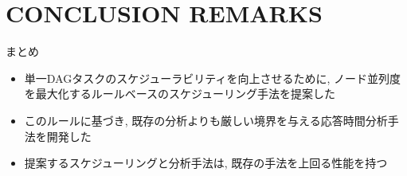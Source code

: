
\section{CONCLUSION REMARKS}
\label{sec: conclusion}

\begin{frame}{まとめ}
    \begin{itemize}
        \item 単一DAGタスクのスケジューラビリティを向上させるために, ノード並列度を最大化するルールベースのスケジューリング手法を提案した
        \item このルールに基づき, 既存の分析よりも厳しい境界を与える応答時間分析手法を開発した
        \item 提案するスケジューリングと分析手法は, 既存の手法を上回る性能を持つ
    \end{itemize}
\end{frame}

